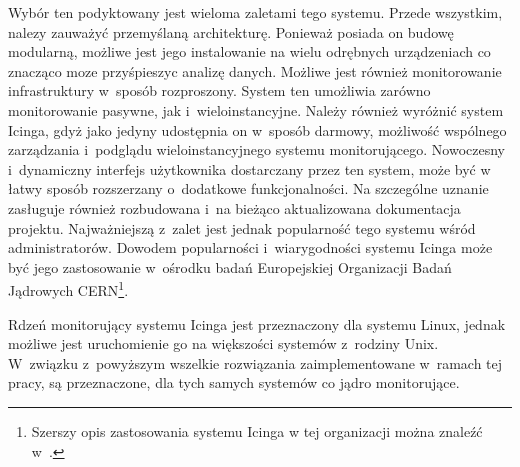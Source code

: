 Wybór ten podyktowany jest wieloma zaletami tego systemu. Przede
wszystkim, nalezy zauważyć przemyślaną architekturę. Ponieważ posiada
on budowę modularną, możliwe jest jego instalowanie na wielu odrębnych
urządzeniach co znacząco moze przyśpieszyc analizę danych. Możliwe
jest również monitorowanie infrastruktury w~sposób rozproszony. System
ten umożliwia zarówno monitorowanie pasywne, jak
i~wieloinstancyjne. Należy również wyróżnić system Icinga, gdyż jako
jedyny udostępnia on w~sposób darmowy, możliwość wspólnego zarządzania
i~podglądu wieloinstancyjnego systemu monitorującego. Nowoczesny
i~dynamiczny interfejs użytkownika dostarczany przez ten system, może
być w łatwy sposób rozszerzany o~dodatkowe funkcjonalności. Na
szczególne uznanie zasługuje również rozbudowana i~na bieżąco
aktualizowana dokumentacja projektu. Najważniejszą z~zalet jest jednak
popularność tego systemu wśród administratorów. Dowodem popularności
i~wiarygodności systemu Icinga może być jego zastosowanie w~ośrodku
badań Europejskiej Organizacji Badań Jądrowych CERN\footnote{Szerszy
  opis zastosowania systemu Icinga w tej organizacji można znaleźć
  w~\cite{www:IcingaCern}.}.

Rdzeń monitorujący systemu Icinga jest przeznaczony dla systemu Linux,
jednak możliwe jest uruchomienie go na większości systemów z~rodziny
Unix. W~związku z~powyższym wszelkie rozwiązania zaimplementowane
w~ramach tej pracy, są przeznaczone, dla tych samych systemów co
jądro monitorujące.
